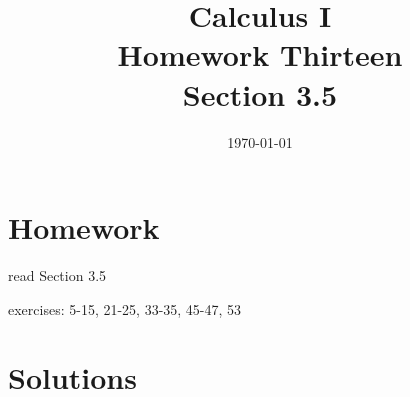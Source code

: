 \documentclass[letterpaper, landscape]{exam}
\title{Calculus I \\ Homework Thirteen \\ Section 3.5}
\author{}
\date{\today}
\begin{document}
  \maketitle

  \section{Homework}
    \begin{itemize*}
      \item read Section 3.5
      \item exercises: 5-15, 21-25, 33-35, 45-47, 53
    \end{itemize*}

  \ifprintanswers

  \section{Solutions}
\end{document}
